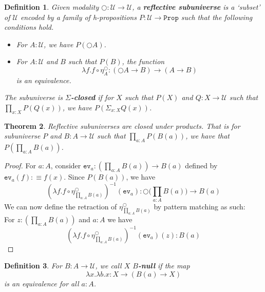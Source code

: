 \documentclass[12pt]{article}
\newtheorem{thm}{Theorem}[section]
\newtheorem{defn}[thm]{Definition}
\begin{document}
\begin{defn}
Given modality $\bigcirc : \mathcal{U} \rightarrow \mathcal{U}$, a \textbf{reflective subuniverse} is a `subset' of $\mathcal{U}$ encoded by a family of h-propositions $P : \mathcal{U} \rightarrow \mathtt{Prop}$ such that the following conditions hold. 
\begin{itemize}
	\item For $A : \mathcal{U}$, we have $P(\bigcirc A)$.
	\item For $A : \mathcal{U}$ and $B$ such that $P(B)$, the function
	$$\lambda f.f \circ \eta_A^\bigcirc : (\bigcirc A \rightarrow B) \rightarrow (A \rightarrow B)$$
	is an equivalence.

\end{itemize}
The subuniverse is $\Sigma$\textbf{-closed} if for $X$ such that $P(X)$ and $Q : X \rightarrow \mathcal{U}$ such that $\prod_{x : X} P(Q(x))$, we have $P(\Sigma_{x : X} Q(x))$.
\end{defn}

\begin{thm}
Reflective subuniverses are closed under products. 
That is for subuniverse $P$ and $B : A \rightarrow \mathcal{U}$ such that $\prod_{a : A}P(B(a))$, we have that $P(\prod_{a : A} B(a))$. 
\end{thm}

\begin{proof}
For $a : A$, consider $\mathtt{ev}_a: (\prod_{a: A}B(a)) \rightarrow B(a)$ defined by $\mathtt{ev}_a (f) : \equiv f(x)$. 
Since $P(B(a))$, we have 
$$(\lambda f.f \circ \eta_{\prod_{a: A}B(a)}^\bigcirc)^{-1} (\mathtt{ev}_a) : \bigcirc\big(\prod_{a: A}B(a)\big) \rightarrow B(a)$$
We can now define the retraction of $\eta^\bigcirc_{\prod_{a : A} B(a)}$ by pattern matching as such:\\
For $z: (\prod_{a: A}B(a))$ and $a : A$ we have 
$$(\lambda f.f \circ \eta_{\prod_{a: A}B(a)}^\bigcirc)^{-1} (\mathtt{ev}_a) (z) : B(a)$$

\end{proof}

\begin{defn}
For $B : A \rightarrow \mathcal{U}$, we call $X$ $B$\textbf{-null} if the map 
$$\lambda x. \lambda b.x : X \rightarrow (B(a) \rightarrow X)$$
is an equivalence for all $a : A$.

\end{defn}
\end{document}
